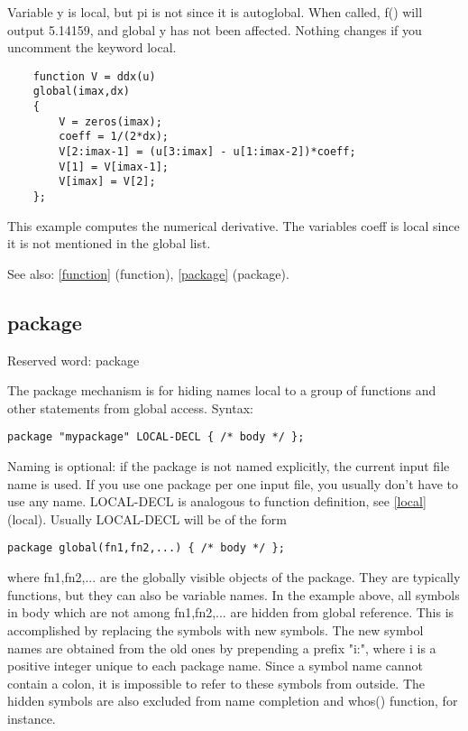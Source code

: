 \documentclass[a4paper]{article}
\begin{document}
Variable y is local, but pi is not since it is autoglobal. When called,
f() will output 5.14159, and global y has not been affected. Nothing
changes if you uncomment the keyword local.

\begin{tscreen}
\begin{verbatim}
    function V = ddx(u)
    global(imax,dx)
    {
        V = zeros(imax);
        coeff = 1/(2*dx);
        V[2:imax-1] = (u[3:imax] - u[1:imax-2])*coeff;
        V[1] = V[imax-1];
        V[imax] = V[2];
    };
\end{verbatim}
\end{tscreen}

This example computes the numerical derivative. The variables
coeff is local since it is not mentioned in the global list.

See also: \ref{function} {(function)}, \ref{package} {(package)}.




\subsection{package\label{package}}

Reserved word: package

The package mechanism is for hiding names local to a group of
functions and other statements from global access. Syntax:

\begin{tscreen}
\begin{verbatim}
package "mypackage" LOCAL-DECL { /* body */ };
\end{verbatim}
\end{tscreen}


Naming is optional: if the package is not named explicitly,
the current input file name is used. If you use one package per
one input file, you usually don't have to use any name.
LOCAL-DECL is analogous to function definition, see \ref{local} {(local)}.
Usually LOCAL-DECL will be of the form

\begin{tscreen}
\begin{verbatim}
package global(fn1,fn2,...) { /* body */ };
\end{verbatim}
\end{tscreen}


where fn1,fn2,... are the globally visible objects of the package.
They are typically functions, but they can also be variable names.
In the example above, all symbols in body which are not among
fn1,fn2,... are hidden from global reference. This is accomplished
by replacing the symbols with new symbols. The new symbol names
are obtained from the old ones by prepending a prefix "i:", where i
is a positive integer unique to each package name. Since a symbol
name cannot contain a colon, it is impossible to refer to these
symbols from outside. The hidden symbols are also excluded from
name completion and whos() function, for instance.
\end{document}
